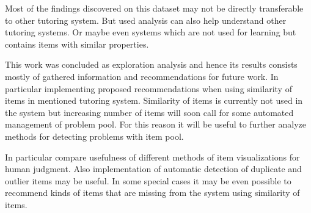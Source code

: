 \documentclass[
  digital, %
  table,   %
  nolof,     %
  nolot,     %
  nocover,
  color
]{fithesis3}
\begin{document}
Most of the findings discovered on this dataset may not be directly transferable to other tutoring system. But used analysis can also help understand other tutoring systems. Or maybe even systems which are not used for learning but contains items with similar properties.


This work was concluded as exploration analysis and hence its results consists mostly of gathered information and recommendations for future work. In particular implementing proposed recommendations when using similarity of items in mentioned tutoring system. Similarity of items is currently not used in the system \umimeCesky{} but increasing number of items will soon call for some automated management of problem pool. For this reason it will be useful to further analyze methods for detecting problems with item pool.

In particular compare usefulness of different methods of item visualizations for human judgment. Also implementation of automatic detection of duplicate and outlier items may be useful. In some special cases it may be even possible to recommend kinds of items that are missing from the system using similarity of items.




\makeatletter\thesis@blocks@clear\makeatother

\end{document}
